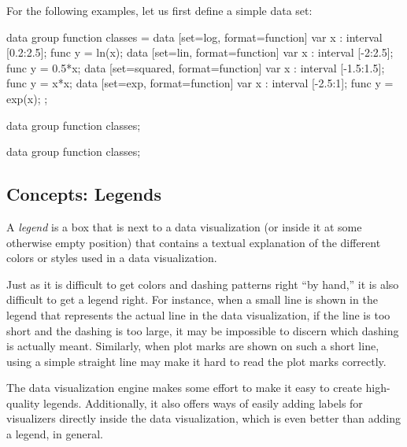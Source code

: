 For the following examples, let us first define a simple data set:
\begin{codeexample}[]
\tikz \datavisualization data group {function classes} = {
  data [set=log, format=function] {
    var x : interval [0.2:2.5];
    func y = ln(\value x);
  }
  data [set=lin, format=function] {
    var x : interval [-2:2.5];
    func y = 0.5*\value x;
  }
  data [set=squared, format=function] {
    var x : interval [-1.5:1.5];
    func y = \value x*\value x;
  }
  data [set=exp, format=function] {
    var x : interval [-2.5:1];
    func y = exp(\value x);
  }
};
\end{codeexample}

\begin{codeexample}[width=6cm]
\tikz \datavisualization [
  school book axes, all axes={unit length=7.5mm},
  visualize as smooth line/.list={log, lin, squared, exp},
  style sheet=strong colors]
data group {function classes};
\end{codeexample}

\begin{codeexample}[width=6cm]
\tikz \datavisualization [
  school book axes, all axes={unit length=7.5mm},
  visualize as smooth line/.list={log, lin, squared, exp},
  style sheet=vary dashing]
data group {function classes};
\end{codeexample}



\subsection{Concepts: Legends}
\label{section-dv-labels-in}

A \emph{legend} is a box that is next to a data visualization (or
inside it at some otherwise empty position) that contains a textual
explanation of the different colors or styles used in a data
visualization.

Just as it is difficult to get colors and dashing patterns right ``by
hand,'' it is also difficult to get a legend right. For instance, when
a small line is shown in the legend that represents the actual line in
the data visualization, if the line is too short and the dashing is
too large, it may be impossible to discern which dashing is actually
meant. Similarly, when plot marks are shown on such a short line,
using a simple straight line may make it hard to read the plot marks
correctly.

The data visualization engine makes some effort to make it easy to
create high-quality legends. Additionally, it also offers ways of
easily adding labels for visualizers directly inside the data
visualization, which is even better than adding a legend, in general.

